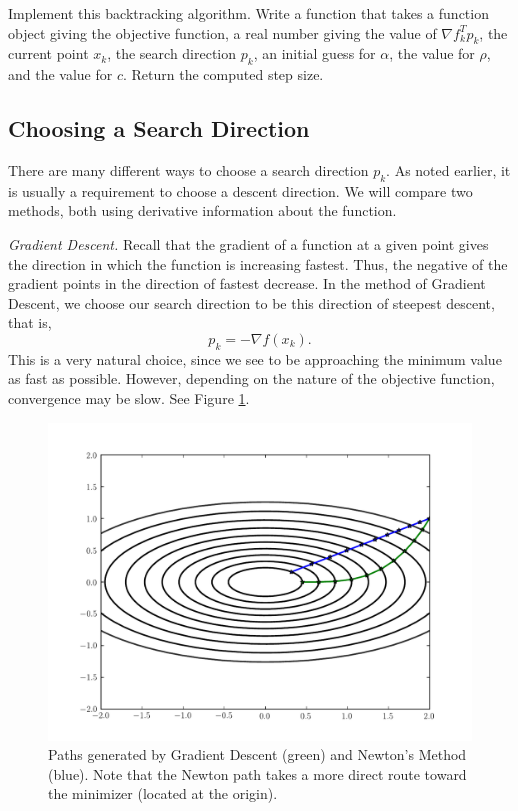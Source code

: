 \begin{problem}
Implement this backtracking algorithm. Write a function  that takes a function
object giving the objective function, a real number giving the value of $\nabla f_k^Tp_k$, the 
current point $x_k$, the search direction $p_k$, an initial guess for $\alpha$, the value for
$\rho$, and the value for $c$. Return the computed step size.
\end{problem}

\subsection*{Choosing a Search Direction}
There are many different ways to choose a search direction $p_k$. As noted earlier, it is usually
a requirement to choose a descent direction. We will compare two methods, both using derivative
information about the function.

\emph{Gradient Descent.} Recall that the gradient of a function at a given point gives the direction
in which the function is increasing fastest. Thus, the negative of the gradient points in the direction
of fastest decrease. In the method of Gradient Descent, we choose our search direction to be
this direction of steepest descent, that is,
$$
p_k = -\nabla f(x_k).
$$
This is a very natural choice, since we see to be approaching the minimum value as fast as possible.
However, depending on the nature of the objective function, convergence may be slow. See Figure 
\ref{linesearch:comparison}.

\begin{figure}
\centering
\includegraphics[width=\textwidth]{comparison.pdf}
\caption{Paths generated by Gradient Descent (green) and Newton's Method (blue).
Note that the Newton path takes a more direct route toward the minimizer (located
at the origin).
}
\label{linesearch:comparison}
\end{figure}

